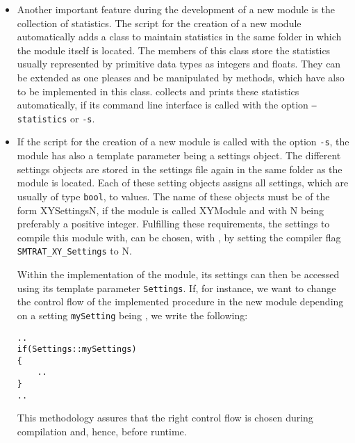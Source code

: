 \begin{itemize}
\item Another important feature during the development of a new module is the collection of statistics. The script \writeModule for the creation of a new module automatically adds a class to maintain statistics in the same folder in which the module itself is located. The members of this class store the statistics usually represented by primitive data types as integers and floats. They can be extended as one pleases and be manipulated by methods, which have also to be implemented in this class. \smtrat collects and prints these statistics automatically, if its command line interface is called with the option \texttt{--statistics} or \texttt{-s}.

\item If the script \writeModule for the creation of a new module is called with the option \texttt{-s}, the module has also a template parameter being a settings object. The different settings objects are stored in the settings file again in the same folder as the module is located. Each of these setting objects assigns all settings, which are usually of type \texttt{bool}, to values. The name of these objects must be of the form XYSettingsN, if the module is called XYModule and with N being preferably a positive integer. Fulfilling these requirements, the settings to compile this module with, can be chosen, \eg with \ccmake, by setting the compiler flag \texttt{SMTRAT\_XY\_Settings} to N. 

Within the implementation of the module, its settings can then be accessed using its template parameter \texttt{Settings}. If, for instance, we want to change the control flow of the implemented procedure in the new module depending on a setting \texttt{mySetting} being \true, we write the following:
\begin{verbatim}
..
if(Settings::mySettings)
{
    ..
}
..
\end{verbatim}
This methodology assures that the right control flow is chosen during compilation and, hence,  before runtime. 
\end{itemize}

